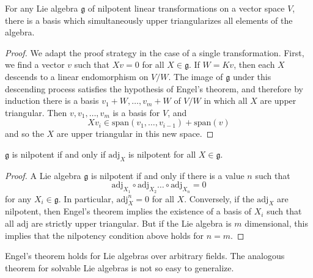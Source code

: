 \begin{theorem}[Engel]
    For any Lie algebra $\mathfrak{g}$ of nilpotent linear transformations on a vector space $V$, there is a basis which simultaneously upper triangularizes all elements of the algebra.
\end{theorem}
\begin{proof}
    We adapt the proof strategy in the case of a single transformation. First, we find a vector $v$ such that $Xv = 0$ for all $X \in \mathfrak{g}$. If $W = K v$, then each $X$ descends to a linear endomorphism on $V/W$. The image of $\mathfrak{g}$ under this descending process satisfies the hypothesis of Engel's theorem, and therefore by induction there is a basis $v_1 + W, \dots, v_m + W$ of $V/W$ in which all $X$ are upper triangular. Then $v, v_1, \dots, v_m$ is a basis for $V$, and
    \[ Xv_i \in \text{span}(v_1, \dots, v_{i-1}) + \text{span}(v) \]
    and so the $X$ are upper triangular in this new space.
\end{proof}

\begin{corollary}
    $\mathfrak{g}$ is nilpotent if and only if $\text{adj}_X$ is nilpotent for all $X \in \mathfrak{g}$.
\end{corollary}
\begin{proof}
    A Lie algebra $\mathfrak{g}$ is nilpotent if and only if there is a value $n$ such that
    \[ \text{adj}_{X_1} \circ \text{adj}_{X_2} \dots \circ \text{adj}_{X_n} = 0 \]
    for any $X_i \in \mathfrak{g}$. In particular, $\text{adj}_X^n = 0$ for all $X$. Conversely, if the $\text{adj}_X$ are nilpotent, then Engel's theorem implies the existence of a basis of $X_i$ such that all $\text{adj}$ are strictly upper triangular. But if the Lie algebra is $m$ dimensional, this implies that the nilpotency condition above holds for $n = m$.
\end{proof}

Engel's theorem holds for Lie algebras over arbitrary fields. The analogous theorem for solvable Lie algebras is not so easy to generalize.

